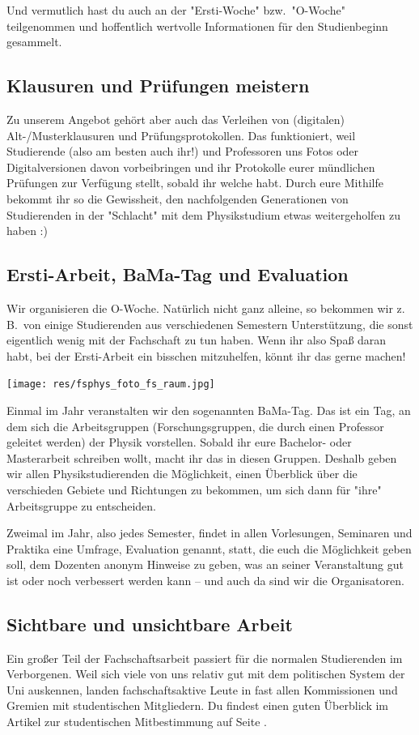 \begin{multicols}{2}
Und vermutlich hast du auch an der "Ersti-Woche" bzw.\ "O-Woche" teilgenommen und hoffentlich wertvolle Informationen für den Studienbeginn gesammelt.

\subsection*{Klausuren und Prüfungen meistern}
Zu unserem Angebot gehört aber auch das Verleihen von (digitalen) Alt-/Musterklausuren und Prüfungsprotokollen.
Das funktioniert, weil Studierende (also am besten auch ihr!) und Professoren uns Fotos oder Digitalversionen davon vorbeibringen und ihr Protokolle eurer mündlichen Prüfungen zur Verfügung stellt, sobald ihr welche habt.
Durch eure Mithilfe bekommt ihr so die Gewissheit, den nachfolgenden Generationen von Studierenden in der "Schlacht" mit dem Physikstudium etwas weitergeholfen zu haben :)

\subsection*{Ersti-Arbeit, BaMa-Tag und Evaluation}
Wir organisieren die O-Woche.
Natürlich nicht ganz alleine, so bekommen wir z.\,B.\ von einige Studierenden aus verschiedenen Semestern Unterstützung, die sonst eigentlich wenig mit der Fachschaft zu tun haben.
Wenn ihr also Spaß daran habt, bei der Ersti-Arbeit ein bisschen mitzuhelfen, könnt ihr das gerne machen!

\texttt{[image: res/fsphys\_foto\_fs\_raum.jpg]}

Einmal im Jahr veranstalten wir den sogenannten BaMa-Tag.
Das ist ein Tag, an dem sich die Arbeitsgruppen (Forschungsgruppen, die durch einen Professor geleitet werden) der Physik vorstellen.
Sobald ihr eure Bachelor- oder Masterarbeit schreiben wollt, macht ihr das in diesen Gruppen.
Deshalb geben wir allen Physikstudierenden die Möglichkeit, einen Überblick über die verschieden Gebiete und Richtungen zu bekommen, um sich dann für "ihre" Arbeitsgruppe zu entscheiden.

Zweimal im Jahr, also jedes Semester, findet in allen Vorlesungen, Seminaren und Praktika eine Umfrage, Evaluation genannt, statt, die euch die Möglichkeit geben soll, dem Dozenten anonym Hinweise zu geben, was an seiner Veranstaltung gut ist oder noch verbessert werden kann -- und auch da sind wir die Organisatoren.

\subsection*{Sichtbare und unsichtbare Arbeit}
Ein großer Teil der Fachschaftsarbeit passiert für die normalen Studierenden im Verborgenen.
Weil sich viele von uns relativ gut mit dem politischen System der Uni auskennen, landen fachschaftsaktive Leute in fast allen Kommissionen und Gremien mit studentischen Mitgliedern.
Du findest einen guten Überblick im Artikel zur studentischen Mitbestimmung auf Seite \pageref{studmit}.


\end{multicols}
